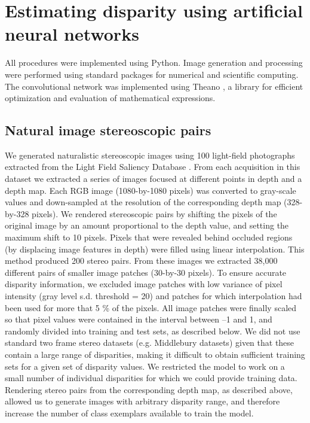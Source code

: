 \clearpage
\section{Estimating disparity using artificial neural networks}

All procedures were implemented using Python. Image generation and processing were performed using standard packages for numerical and scientific computing. The convolutional network was implemented using Theano \cite{bergstra-proc-scipy-2010}, a library for efficient optimization and evaluation of mathematical expressions.

\subsection{Natural image stereoscopic pairs}

We generated naturalistic stereoscopic images using 100 light-field photographs extracted from the Light Field Saliency Database \cite{6909755}. From each acquisition in this dataset we extracted a series of images focused at different points in depth and a depth map. Each RGB image (1080-by-1080 pixels) was converted to gray-scale values and down-sampled at the resolution of the corresponding depth map (328-by-328 pixels). We rendered stereoscopic pairs by shifting the pixels of the original image by an amount proportional to the depth value, and setting the maximum shift to 10 pixels. Pixels that were revealed behind occluded regions (by displacing image features in depth) were filled using linear interpolation.
This method produced 200 stereo pairs. From these images we extracted 38,000 different pairs of smaller image patches (30-by-30 pixels). To ensure accurate disparity information, we excluded image patches with low variance of pixel intensity (gray level s.d. threshold = 20) and patches for which interpolation had been used for more that 5 \% of the pixels. All image patches were finally scaled so that pixel values were contained in the interval between –1 and 1, and randomly divided into training and test sets, as described below.
We did not use standard two frame stereo datasets (e.g. Middlebury datasets) given that these contain a large range of disparities, making it difficult to obtain sufficient training sets for a given set of disparity values. We restricted the model to work on a small number of individual disparities for which we could provide training data. Rendering stereo pairs from the corresponding depth map, as described above, allowed us to generate images with arbitrary disparity range, and therefore increase the number of class exemplars available to train the model.

